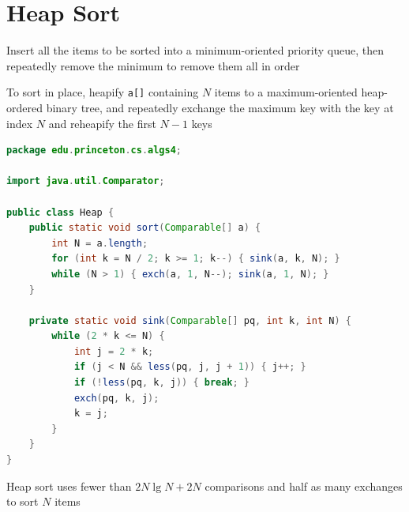 \documentclass[8pt,a4paper,compress]{beamer}
\begin{document}
\section{Heap Sort}
\begin{frame}[fragile]
\pause

Insert all the items to be sorted into a minimum-oriented priority queue, then repeatedly remove the minimum to remove them all in order

\pause
\bigskip

To sort in place, heapify \lstinline$a[]$ containing $N$ items to a maximum-oriented heap-ordered binary tree, and repeatedly exchange the maximum key with the key at index $N$ and reheapify the first $N - 1$ keys 

\pause

\begin{lstlisting}[language=Java]
package edu.princeton.cs.algs4;

import java.util.Comparator;

public class Heap {
    public static void sort(Comparable[] a) {
        int N = a.length;
        for (int k = N / 2; k >= 1; k--) { sink(a, k, N); }
        while (N > 1) { exch(a, 1, N--); sink(a, 1, N); }
    }
    
    private static void sink(Comparable[] pq, int k, int N) {
        while (2 * k <= N) {
            int j = 2 * k;
            if (j < N && less(pq, j, j + 1)) { j++; }
            if (!less(pq, k, j)) { break; }
            exch(pq, k, j);
            k = j;
        }
    }
}
\end{lstlisting}

\pause
\bigskip

Heap sort uses fewer than $2N \lg N + 2N$ comparisons and half as many exchanges to sort $N$ items
\end{frame}
\end{document}
